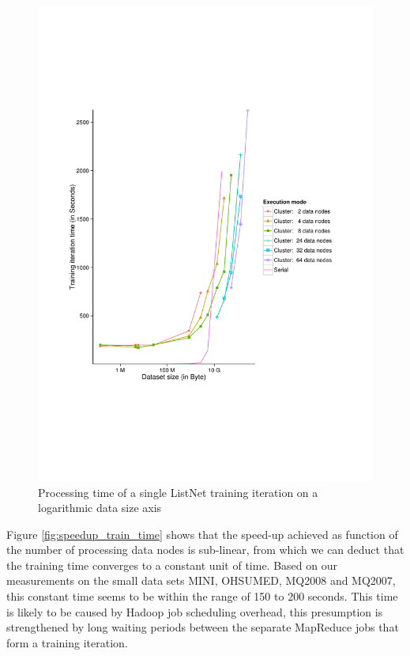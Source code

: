 \begin{figure}
\centering
\includegraphics[trim=3cm 5cm 0cm 5cm, scale=0.8]{gfx/time_single_logx.pdf}
\caption{Processing time of a single ListNet training iteration on a logarithmic data size axis}
\label{fig:listnet_train_time_log}
\end{figure}

Figure \ref{fig:speedup_train_time} shows that the speed-up achieved as function of the number of processing data nodes is sub-linear, from which we can deduct that the training time converges to a constant unit of time. Based on our measurements on the small data sets MINI, OHSUMED, MQ2008 and MQ2007, this constant time seems to be within the range of 150 to 200 seconds. This time is likely to be caused by Hadoop job scheduling overhead, this presumption is strengthened by long waiting periods between the separate MapReduce jobs that form a training iteration.\\

